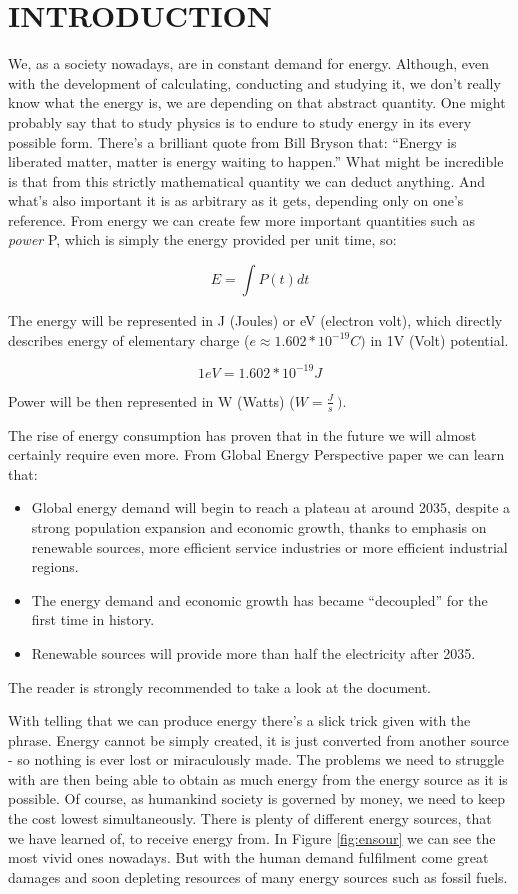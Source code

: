 \chapter{INTRODUCTION}
We, as a society nowadays, are in constant demand for energy. Although,
even with the development of calculating, conducting and studying it, we
don't really know what the energy is, we are depending on that abstract
quantity. One might probably say that to study physics is to endure to
study energy in its every possible form. There's a brilliant quote from
Bill Bryson that: ``Energy is liberated matter, matter is energy waiting
to happen.'' What might be incredible is that from this strictly
mathematical quantity we can deduct anything. And what's also important
it is as arbitrary as it gets, depending only on one's reference. From
energy we can create few more important quantities such as \emph{power}
P, which is simply the energy provided per unit time, so:

$$E = \int P\left( t \right)dt$$

The energy will be represented in J (Joules) or eV (electron
volt), which directly describes energy of elementary charge
(\(e \approx 1.602*10^{- 19}C)\) in 1V (Volt) potential.

$$1eV = 1.602*10^{- 19}J$$

Power will be then represented in W (Watts) (\(W = \frac{J}{s}\ ).\)

The rise of energy consumption has proven that in the future we will
almost certainly require even more. From Global Energy Perspective paper 
\cite{Insights2019} we can learn that:

\begin{itemize}
\item Global energy demand will begin to reach a plateau at around 2035, despite a strong population expansion and economic growth, thanks to emphasis on renewable sources, more efficient service industries or more efficient industrial regions.
\item The energy demand and economic growth has became ``decoupled'' for the first time in history.
\item Renewable sources will provide more than half the electricity after 2035.
\end{itemize}

\noindent The reader is strongly recommended to take a look at the document.

\noindent With telling that we can produce energy there's a slick trick given with
the phrase. Energy cannot be simply created, it is just converted from
another source - so nothing is ever lost or miraculously made. The
problems we need to struggle with are then being able to obtain as much
energy from the energy source as it is possible. Of course, as
humankind society is governed by money, we need to keep the cost lowest simultaneously. There is plenty of different energy sources, that we have learned of, to receive energy
from. In Figure \ref{fig:ensour} we can see the most vivid ones nowadays. But with
the human demand fulfilment come great damages and soon depleting
resources of many energy sources such as fossil fuels.


